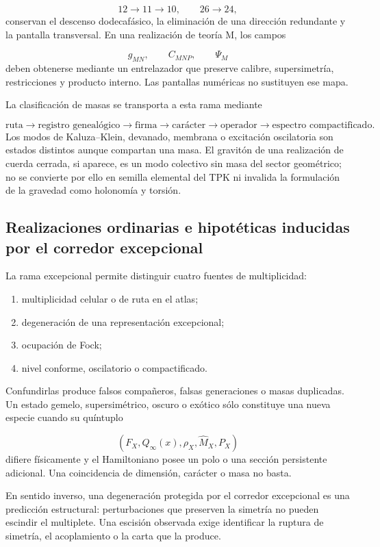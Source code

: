 \[
12\longrightarrow11\longrightarrow10,
\qquad
26\longrightarrow24,
\]
conservan el descenso dodecafásico, la eliminación de una dirección redundante y la pantalla transversal. En una realización de teoría M, los campos

\[
g_{MN},\qquad C_{MNP},\qquad\Psi_M
\]
deben obtenerse mediante un entrelazador que preserve calibre, supersimetría, restricciones y producto interno. Las pantallas numéricas no sustituyen ese mapa.

La clasificación de masas se transporta a esta rama mediante

\[
\text{ruta}
\longrightarrow\text{registro genealógico}
\longrightarrow\text{firma}
\longrightarrow\text{carácter}
\longrightarrow\text{operador}
\longrightarrow\text{espectro compactificado}.
\]
Los modos de Kaluza--Klein, devanado, membrana o excitación oscilatoria son estados distintos aunque compartan una masa. El gravitón de una realización de cuerda cerrada, si aparece, es un modo colectivo sin masa del sector geométrico; no se convierte por ello en semilla elemental del TPK ni invalida la formulación de la gravedad como holonomía y torsión.

\subsection{Realizaciones ordinarias e hipotéticas inducidas por el corredor excepcional}
La rama excepcional permite distinguir cuatro fuentes de multiplicidad:

\begin{enumerate}
\item multiplicidad celular o de ruta en el atlas;
\item degeneración de una representación excepcional;
\item ocupación de Fock;
\item nivel conforme, oscilatorio o compactificado.
\end{enumerate}
Confundirlas produce falsos compañeros, falsas generaciones o masas duplicadas. Un estado gemelo, supersimétrico, oscuro o exótico sólo constituye una nueva especie cuando su quíntuplo

\[
(F_X,Q_\infty(x),\rho_X,\widehat M_X,P_X)
\]
difiere físicamente y el Hamiltoniano posee un polo o una sección persistente adicional. Una coincidencia de dimensión, carácter o masa no basta.

En sentido inverso, una degeneración protegida por el corredor excepcional es una predicción estructural: perturbaciones que preserven la simetría no pueden escindir el multiplete. Una escisión observada exige identificar la ruptura de simetría, el acoplamiento o la carta que la produce.

